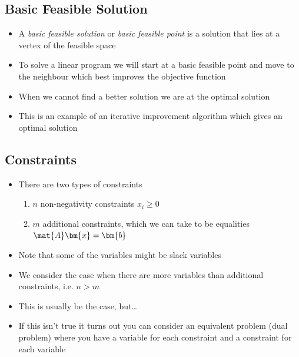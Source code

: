 \Outline %

\begin{slide}
\section[-2]{Basic Feasible Solution}

\begin{PauseHighLight}
  \begin{itemize}
  \item A \textit{basic feasible solution} or \textit{basic feasible
      point} is a solution that lies at a vertex of the feasible space\pause
  \item To solve a linear program we will start at a basic feasible
    point and move to the neighbour which best improves the objective
    function\pause
  \item When we cannot find a better solution we are at the optimal
    solution\pause
  \item This is an example of an iterative improvement algorithm which
    gives an optimal solution\pause
  \end{itemize}
\end{PauseHighLight}

\end{slide}


\begin{slide}
\section[-2]{Constraints}

\begin{PauseHighLight}
  \begin{itemize}
  \item There are two types of constraints
    \begin{enumerate}
    \item $n$ non-negativity constraints $x_i\geq 0$
    \item $m$ additional constraints, which we can take to be equalities
      $\mat{A}\bm{x} = \bm{b}$\pause
    \end{enumerate}
  \item Note that some of the variables might be slack variables\pause
  \item We consider the case when there are more variables than
    additional constraints, i.e. $n>m$\pause
  \item This is usually be the case, but\ldots\pause
  \item If this isn't true it turns out you can consider an equivalent
    problem (dual problem) where you have a variable for each constraint
    and a constraint for each variable\pause
  \end{itemize}
\end{PauseHighLight}

\end{slide}

